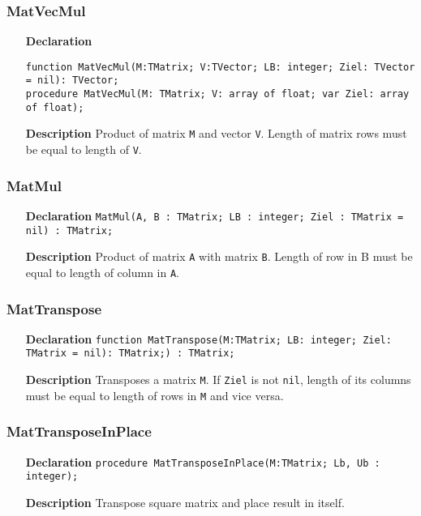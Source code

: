 \documentclass[12pt,a4paper,oneside]{report}
\newcommand{\declarationitem}[1]{\textbf{#1}}
\newcommand{\descriptiontitle}[1]{\textbf{#1}}
\newcommand{\code}[1]{\texttt{#1}}
\begin{document}
\subsubsection{MatVecMul}
\label{MatVecMul}
\begin{itemize}
	\item[\declarationitem{Declaration}\hfill]
	\begin{flushleft}
	\code{function MatVecMul(M:TMatrix; V:TVector; LB: integer; Ziel: TVector = nil): TVector;}\\
	\code{procedure MatVecMul(M: TMatrix; V: array of float; var Ziel: array of float);}
	\end{flushleft}
	\item[\descriptiontitle{Description}]Product of matrix \code{M} and vector \code{V}. Length of matrix rows must be equal to length of \code{V}.
\end{itemize}
\subsubsection{MatMul}
\label{MatMul}
\begin{itemize}
\item[\declarationitem{Declaration}\hfill]
\code{MatMul(A, B : TMatrix; LB : integer; Ziel : TMatrix = nil) : TMatrix;}
\item[\descriptiontitle{Description}] Product of matrix \code{A} with matrix \code{B}. Length of row in B must be equal to length of column in \code{A}.
\end{itemize}
\subsubsection{MatTranspose}
\label{MatTranspose}
\begin{itemize}
\item[\declarationitem{Declaration}\hfill]\code{function MatTranspose(M:TMatrix; LB: integer; Ziel: TMatrix = nil): TMatrix;) : TMatrix;}
\item[\descriptiontitle{Description}] Transposes a matrix \code{M}. If \code{Ziel} is not \code{nil}, length of its columns must be equal to length of rows in \code{M} and vice versa.
\end{itemize}
\subsubsection{MatTransposeInPlace}
\label{MatTransposeInPlace}
\begin{itemize}
\item[\declarationitem{Declaration}\hfill]\code{procedure MatTransposeInPlace(M:TMatrix; Lb, Ub : integer);}
\item[\descriptiontitle{Description}]Transpose square matrix and place result in itself.
\end{itemize}
\end{document}
